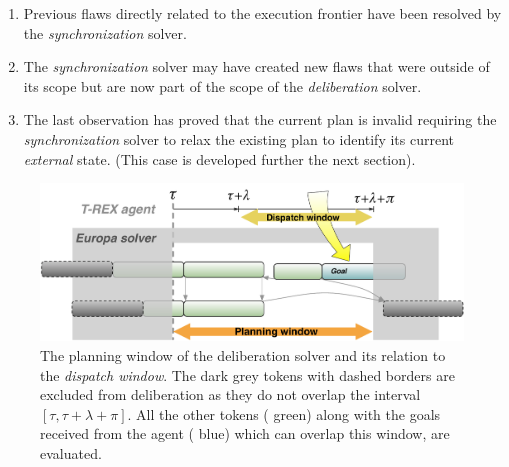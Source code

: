 \begin{enumerate}

\item Previous flaws directly related to the execution frontier have
  been resolved by the {\em synchronization} solver.

\item The {\em synchronization} solver may have created new flaws that
  were outside of its scope but are now part of the scope of the {\em
    deliberation} solver.

\item The last observation has proved that the current plan is invalid
  requiring the {\em synchronization} solver to relax the existing
  plan to identify its current {\em external} state. (This case is
  developed further  the next section).

\end{enumerate}

\begin{figure}[!htbp]
  \centering
  \includegraphics[width=0.65\columnwidth]{figs/plan_window}
  \caption{\small The planning window of the deliberation solver and
    its relation to the {\em dispatch window}. The dark grey tokens
    with dashed borders are excluded from deliberation as they do not
    overlap the interval $[\tau, \tau+\lambda+\pi]$. All the other
    tokens ({\color{green} green}) along with the goals received from
    the agent ({\color{blue} blue}) which can overlap this window, are
    evaluated.}
  \label{fig:plan:window}
\end{figure}

